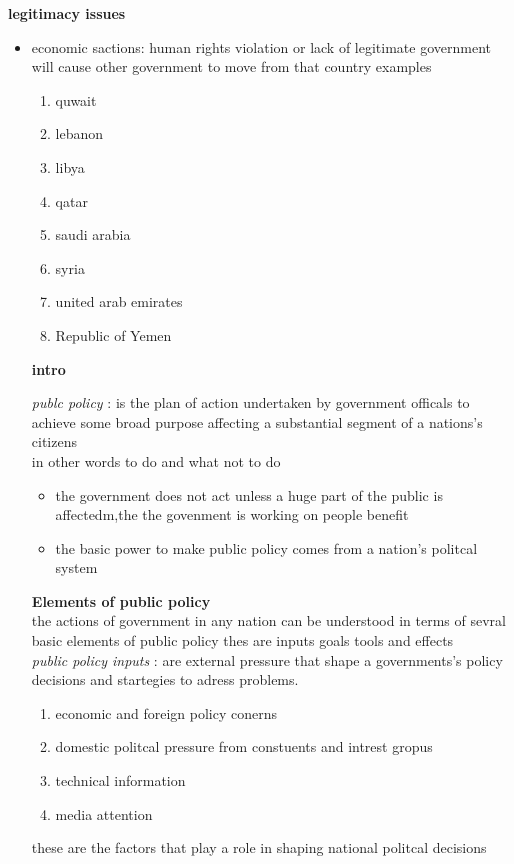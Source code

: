\documentclass{article}
\newcommand\tab[1][1cm]{\hspace*{#1}}
\begin{document}
\textbf{\huge legitimacy issues   }
\begin{itemize}
\item economic sactions: human rights violation  or lack of legitimate government will cause other government to move from that country examples  
\begin{enumerate}
\item quwait
\item lebanon 
\item libya 
\item qatar 
\item saudi arabia 
\item syria
\item united arab emirates 
\item Republic of Yemen
\end{enumerate}

\tab[3cm]{ government's public policy roles }

\textbf{\huge intro }
 
\textit{publc policy} : is the plan of action undertaken by government officals to achieve some broad purpose affecting a substantial segment of a nations's citizens \\
in other words to do and what not to do
\begin{itemize}
\item the government does not act unless a huge part of the public is affectedm,the the govenment is working on people benefit 
\item the basic power to make public policy comes from a nation's politcal system 
\end{itemize} 

\textbf{\huge Elements of public policy}\\
the actions of government in any nation can be understood  in terms of sevral basic elements of public policy thes are inputs goals tools and effects \\
\textit{public policy inputs} : are external pressure  that shape a governments's policy  decisions  and startegies to adress problems. 


\begin{enumerate}
\item economic and foreign policy conerns 
\item domestic politcal pressure from constuents and intrest gropus 
\item technical information 
\item media attention 
\end{enumerate}
these are the factors that play a role in shaping national politcal decisions 


\end{itemize}
\end{document}
